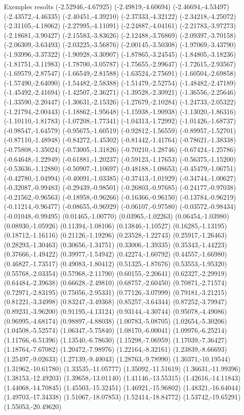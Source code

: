 \documentclass[11pt,a4paper]{article}
\begin{document}
\begin{fmex}{Exemples resolts}
(-2.52946,-4.67925) (-2.49819,-4.60694) (-2.46694,-4.53497) (-2.43572,-4.46335) (-2.40451,-4.39210) (-2.37333,-4.32122) (-2.34218,-4.25072) (-2.31105,-4.18062) (-2.27995,-4.11091) (-2.24887,-4.04161) (-2.21783,-3.97273) (-2.18681,-3.90427) (-2.15583,-3.83626) (-2.12488,-3.76869) (-2.09397,-3.70158) (-2.06309,-3.63493) (-2.03225,-3.56876) (-2.00145,-3.50308) (-1.97069,-3.43790) (-1.93996,-3.37322) (-1.90928,-3.30907) (-1.87865,-3.24545) (-1.84805,-3.18236) (-1.81751,-3.11983) (-1.78700,-3.05787) (-1.75655,-2.99647) (-1.72615,-2.93567) (-1.69579,-2.87547) (-1.66549,-2.81588) (-1.63524,-2.75691) (-1.60504,-2.69858) (-1.57490,-2.64090) (-1.54482,-2.58388) (-1.51479,-2.52754) (-1.48482,-2.47189) (-1.45492,-2.41694) (-1.42507,-2.36271) (-1.39528,-2.30921) (-1.36556,-2.25646) (-1.33590,-2.20447) (-1.30631,-2.15326) (-1.27679,-2.10284) (-1.24733,-2.05322) (-1.21794,-2.00443) (-1.18862,-1.95648) (-1.15938,-1.90938) (-1.13020,-1.86316) (-1.10110,-1.81783) (-1.07208,-1.77341) (-1.04313,-1.72992) (-1.01426,-1.68737) (-0.98547,-1.64579) (-0.95675,-1.60519) (-0.92812,-1.56559) (-0.89957,-1.52701) (-0.87110,-1.48948) (-0.84272,-1.45302) (-0.81442,-1.41764) (-0.78621,-1.38338) (-0.75808,-1.35024) (-0.73005,-1.31826) (-0.70210,-1.28746) (-0.67424,-1.25786) (-0.64648,-1.22949) (-0.61881,-1.20237) (-0.59123,-1.17653) (-0.56375,-1.15200) (-0.53636,-1.12880) (-0.50907,-1.10697) (-0.48188,-1.08653) (-0.45479,-1.06751) (-0.42780,-1.04994) (-0.40091,-1.03385) (-0.37413,-1.01929) (-0.34744,-1.00627) (-0.32087,-0.99483) (-0.29439,-0.98501) (-0.26803,-0.97685) (-0.24177,-0.97038) (-0.21562,-0.96563) (-0.18958,-0.96266) (-0.16366,-0.96150) (-0.13784,-0.96219) (-0.11214,-0.96477) (-0.08655,-0.96929) (-0.06107,-0.97580) (-0.03572,-0.98434) (-0.01048,-0.99495) (0.01465,-1.00770) (0.03965,-1.02263) (0.06454,-1.03980) (0.08930,-1.05926) (0.11394,-1.08106) (0.13846,-1.10527) (0.16285,-1.13195) (0.18712,-1.16116) (0.21126,-1.19296) (0.23528,-1.22743) (0.25917,-1.26463) (0.28293,-1.30463) (0.30656,-1.34751) (0.33006,-1.39335) (0.35343,-1.44223) (0.37666,-1.49422) (0.39977,-1.54942) (0.42274,-1.60792) (0.44557,-1.66980) (0.46827,-1.73517) (0.49083,-1.80412) (0.51325,-1.87676) (0.53553,-1.95320) (0.55768,-2.03354) (0.57968,-2.11790) (0.60155,-2.20641) (0.62327,-2.29919) (0.64484,-2.39638) (0.66628,-2.49810) (0.68757,-2.60450) (0.70871,-2.71574) (0.72971,-2.83195) (0.75056,-2.95331) (0.77126,-3.07999) (0.79181,-3.21215) (0.81221,-3.34998) (0.83247,-3.49368) (0.85257,-3.64344) (0.87252,-3.79947) (0.89231,-3.96200) (0.91195,-4.13124) (0.93144,-4.30744) (0.95078,-4.49086) (0.96995,-4.68174) (0.98897,-4.88038) (1.00783,-5.08705) (1.02654,-5.30206) (1.04508,-5.52574) (1.06347,-5.75840) (1.08170,-6.00041) (1.09976,-6.25214) (1.11766,-6.51396) (1.13540,-6.78630) (1.15298,-7.06959) (1.17039,-7.36427) (1.18764,-7.67082) (1.20472,-7.98976) (1.22164,-8.32161) (1.23839,-8.66693) (1.25497,-9.02633) (1.27139,-9.40043) (1.28763,-9.78990) (1.30371,-10.19544) (1.31962,-10.61780) (1.33535,-11.05777) (1.35092,-11.51619) (1.36631,-11.99396) (1.38153,-12.49203) (1.39658,-13.01140) (1.41146,-13.55315) (1.42616,-14.11843) (1.44068,-14.70845) (1.45503,-15.32451) (1.46921,-15.96802) (1.48321,-16.64044) (1.49703,-17.34338) (1.51067,-18.07853) (1.52414,-18.84772) (1.53742,-19.65291) (1.55053,-20.49620) 
\end{fmex}
\end{document}
